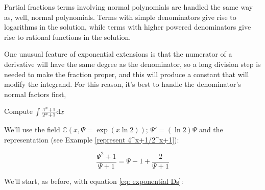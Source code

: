 Partial fractions terms involving normal polynomials are handled the
same way as, well, normal polynomials.  Terms with simple denominators
give rise to logarithms in the solution, while terms with higher
powered denominators give rise to rational functions in the solution.

One unusual feature of exponential extensions is that the numerator of
a derivative will have the same degree as the denominator, so a long
division step is needed to make the fraction proper, and this will
produce a constant that will modify the integrand.  For this reason,
it's best to handle the denominator's normal factors first,



\begin{comment}

\vfil\eject

\example Compute $\int {{4^x-1}\over{2^x+1}} {\rm d}x$
\label{integrate 4^x-1/2^x+1}

We'll use the field ${\mathbb C}(x,\Psi = \exp(x \ln 2))$; $\Psi' =
(\ln 2)\Psi$ and the representation (see Example
\ref{represent 4^x+1/2^x+1}):

$$ \frac{\Psi^2-1}{\Psi+1} = \Psi-1$$

So we need to find a solution of the form $a\Psi + \bar{b}$ ($\bar{b}$
can include additional logarithmic elements) that satisfy the Risch
equations:

$$a'\Psi + a\Psi' = a'\Psi + a(\ln 2)\Psi = \Psi \qquad a' + a(\ln 2) = 1$$
$$\bar{b}' = -1$$

Both equations have fairly obvious solutions:

$$a = \frac{1}{\ln 2} \qquad \bar{b}=-x$$

So our solution is

$$\int {{4^x+1}\over{2^x+1}} {\rm d}x = \frac{1}{\ln 2}\Psi - x =
\frac{1}{\ln 2}2^x - x$$

\endexample

\end{comment}

\vfil\eject

\example Compute $\int {{4^x+1}\over{2^x+1}} {\rm d}x$
\label{integrate 4^x+1/2^x+1}

We'll use the field ${\mathbb C}(x,\Psi = \exp(x \ln 2))$; $\Psi' =
(\ln 2)\Psi$ and the representation (see Example
\ref{represent 4^x+1/2^x+1}):

$$ \frac{\Psi^2+1}{\Psi+1} = \Psi-1+\frac{2}{\Psi+1}$$

We'll start, as before, with equation
\eqref{eq: exponential Ds}:

